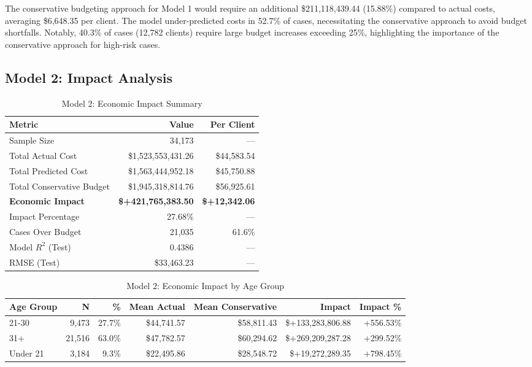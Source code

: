 The conservative budgeting approach for Model 1 would require an additional \$211,118,439.44 (15.88\%) compared to actual costs, averaging \$6,648.35 per client. The model under-predicted costs in 52.7\% of cases, necessitating the conservative approach to avoid budget shortfalls. Notably, 40.3\% of cases (12,782 clients) require large budget increases exceeding 25\%, highlighting the importance of the conservative approach for high-risk cases. 

\clearpage

\subsection{Model 2: Impact Analysis}
\label{subsec:model2_impact}

\begin{table}[htbp]
\centering
\small
\caption{Model 2: Economic Impact Summary}
\label{tab:model2_impact_summary}
\begin{tabular}{lrr}
\toprule
\textbf{Metric} & \textbf{Value} & \textbf{Per Client} \\
\midrule
Sample Size & 34,173 & --- \\
\midrule
Total Actual Cost & \$1,523,553,431.26 & \$44,583.54 \\
Total Predicted Cost & \$1,563,444,952.18 & \$45,750.88 \\
Total Conservative Budget & \$1,945,318,814.76 & \$56,925.61 \\
\midrule
\textbf{Economic Impact} & \textbf{\$+421,765,383.50} & \textbf{\$+12,342.06} \\
Impact Percentage & 27.68\% & --- \\
\midrule
Cases Over Budget & 21,035 & 61.6\% \\
\midrule
Model $R^2$ (Test) & 0.4386 & --- \\
RMSE (Test) & \$33,463.23 & --- \\
\bottomrule
\end{tabular}
\end{table}

\begin{table}[htbp]
\centering
\small
\caption{Model 2: Economic Impact by Age Group}
\label{tab:model2_impact_age}
\begin{tabular}{lrrrrrr}
\toprule
\textbf{Age Group} & \textbf{N} & \textbf{\%} & \textbf{Mean Actual} & \textbf{Mean Conservative} & \textbf{Impact} & \textbf{Impact \%} \\
\midrule
21-30 & 9,473 & 27.7\% & \$44,741.57 & \$58,811.43 & \$+133,283,806.88 & +556.53\% \\
31+ & 21,516 & 63.0\% & \$47,782.57 & \$60,294.62 & \$+269,209,287.28 & +299.52\% \\
Under 21 & 3,184 & 9.3\% & \$22,495.86 & \$28,548.72 & \$+19,272,289.35 & +798.45\% \\
\bottomrule
\end{tabular}
\end{table}

